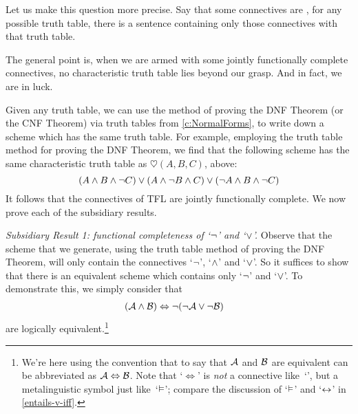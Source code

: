 Let us make this question more precise. Say that some connectives are  \emph{\ifeff}, for any possible truth table, there is a sentence containing only those connectives with that truth table.


The general point is, when we are armed with some jointly functionally complete connectives, no characteristic truth table lies beyond our grasp. And in fact, we are in luck.

Given any truth table, we can use the method of proving the DNF Theorem (or the CNF Theorem) via truth tables from \cref{c:NormalForms}, to write down a scheme which has the same truth table. For example, employing the truth table method for proving the DNF Theorem, we find that the following scheme has the same characteristic truth table as $\heartsuit(A,B,C)$, above:
		$$(A \wedge B \wedge \neg C) \vee (A \wedge \neg B \wedge C) \vee (\neg A \wedge B \wedge \neg C)$$			
It follows that the connectives of TFL are jointly functionally complete. We now prove each of the subsidiary results.
	
\emph{Subsidiary Result 1: functional completeness of `$\neg$' and `$\vee$'.} Observe that the scheme that we generate, using the truth table method of proving the DNF Theorem, will only contain the connectives `$\neg$', `$\wedge$' and `$\vee$'. So it suffices to show that there is an equivalent scheme which contains only `$\neg$' and `$\vee$'. To demonstrate this, we simply consider that
		\begin{align*}
		(\mathcal{A} \wedge \mathcal{B}) & \Leftrightarrow \neg(\neg \mathcal{A} \vee\neg \mathcal{B})
		\end{align*}
		are logically equivalent.\footnote{We're here using the convention
		that to say that $\mathcal{A}$ and $\mathcal{B}$ are equivalent can be
		abbreviated as $\mathcal{A} \Leftrightarrow \mathcal{B}$. Note that
		`$\Leftrightarrow$' is \emph{not} a connective like~`\eiff', but a
		metalinguistic symbol just like~`$\vDash$'; compare the discussion
		of `$\vDash$' and `$\leftrightarrow$' in \cref{entails-v-iff}.}

